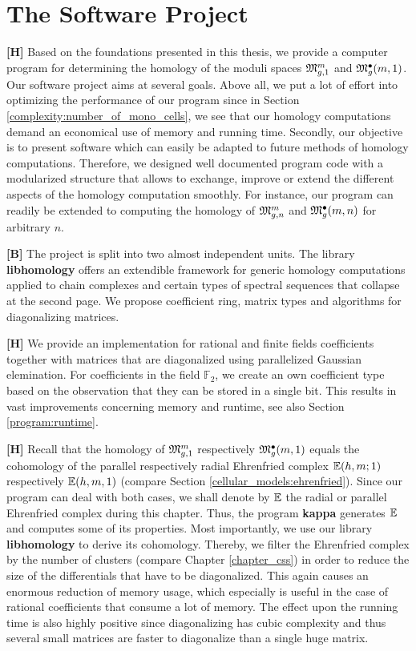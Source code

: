 \chapter{The Software Project}
\label{program}

{\bf [H]} Based on the foundations presented in this thesis, 
we provide a computer program for determining the homology of the moduli spaces $\Modspc[1]$ and $\ModspcRad[1]$.
Our software project aims at several goals.
Above all, we put a lot of effort into optimizing the performance of our program
since in Section \ref{complexity:number_of_mono_cells}, we see that our homology computations demand 
an economical use of memory and running time.  
Secondly, our objective is to present software which can easily be adapted to future methods of homology computations. 
Therefore, we designed well documented program code with a modularized structure 
that allows to exchange, improve or extend the different aspects of the homology computation smoothly.
For instance, our program can readily be extended to computing the homology of $\Modspc$ and $\ModspcRad$ for arbitrary $n$.

{\bf [B]} The project is split into two almost independent units.
The library {\bf libhomology} offers an extendible framework for generic homology computations applied to chain complexes and certain types of spectral sequences that collapse at the second page.
We propose coefficient ring, matrix types and algorithms for diagonalizing matrices.

{\bf [H]} We provide an implementation for rational and finite fields coefficients together with matrices that are diagonalized using parallelized Gaussian elemination.
For coefficients in the field $\mathbb F_2$, we create an own coefficient type based on the observation that they can be stored in a single bit.
This results in vast improvements concerning memory and runtime, see also Section \ref{program:runtime}.

{\bf [H]} Recall that the homology of $\Modspc[1]$ respectively $\ModspcRad[1]$ equals the cohomology of the parallel respectively radial Ehrenfried complex $\E(h, m;1)$ respectively $\E(h, m, 1)$
(compare Section \ref{cellular_models:ehrenfried}).
Since our program can deal with both cases, we shall denote by $\Ehrprog$ the radial or parallel Ehrenfried complex during this chapter.
Thus, the program {\bf kappa} generates $\Ehrprog$ and computes some of its properties.
Most importantly, we use our library {\bf libhomology} to derive its cohomology.
Thereby, we filter the Ehrenfried complex by the number of clusters (compare Chapter \ref{chapter_css})
in order to reduce the size of the differentials that have to be diagonalized.
This again causes an enormous reduction of memory usage, 
which especially is useful in the case of rational coefficients that consume a lot of memory. 
The effect upon the running time is also highly positive 
since diagonalizing has cubic complexity and thus several small matrices are faster to diagonalize than a single huge matrix.

